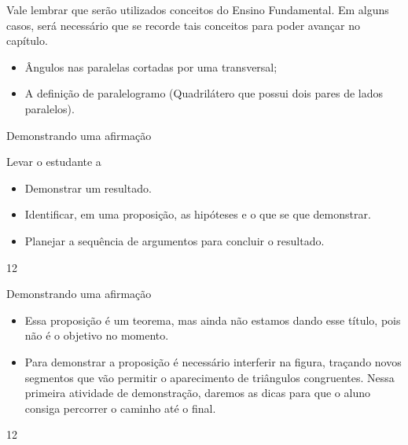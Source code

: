 \arrange{}
\begin{texto}
{\def\currentcolor{session4}
\begin{observation}{}
Vale lembrar que serão utilizados conceitos do Ensino Fundamental. Em alguns casos, será necessário que se recorde tais conceitos para poder avançar no capítulo.
\begin{itemize}
\item {} 
Ângulos nas paralelas cortadas por uma transversal;

\item {} 
A definição de paralelogramo (Quadrilátero que possui dois pares de lados paralelos).

\end{itemize}
\end{observation}
}
\end{texto}
\clearmargin
\begin{objectives}{Demonstrando uma afirmação}
{
Levar o estudante a
\begin{itemize}
\item {} 
Demonstrar um resultado.

\item {} 
Identificar, em uma proposição, as hipóteses e o que se que demonstrar.

\item {} 
Planejar a sequência de argumentos para concluir o resultado.

\end{itemize}

}{1}{2}
\end{objectives}
\begin{sugestions}{Demonstrando uma afirmação}
{
\begin{itemize}
\item {} 
Essa proposição é um teorema, mas ainda não estamos dando esse título, pois não é o objetivo no momento.

\item {} 
Para demonstrar a proposição é necessário interferir na figura, traçando novos segmentos que vão permitir o aparecimento de triângulos congruentes. Nessa primeira atividade de demonstração, daremos as dicas para que o aluno consiga percorrer o caminho até o final.

\end{itemize}
}{1}{2}
\end{sugestions}
